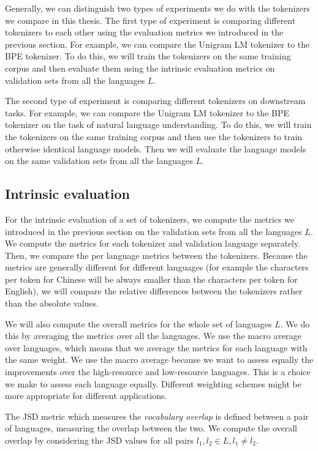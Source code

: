 Generally, we can distinguish two types of experiments we do with the tokenizers we compare in this thesis. The first type of experiment is comparing different tokenizers to each other using the evaluation metrics we introduced in the previous section. For example, we can compare the Unigram LM tokenizer to the BPE tokenizer. To do this, we will train the tokenizers on the same training corpus and then evaluate them using the intrinsic evaluation metrics on validation sets from all the languages $L$. 

The second type of experiment is comparing different tokenizers on downstream tasks. For example, we can compare the Unigram LM tokenizer to the BPE tokenizer on the task of natural language understanding. To do this, we will train the tokenizers on the same training corpus and then use the tokenizers to train otherwise identical language models. Then we will evaluate the language models on the same validation sets from all the languages $L$. 

\subsection{Intrinsic evaluation}
\label{sec:intrinsic_evaluation}

For the intrinsic evaluation of a set of tokenizers, we compute the metrics we introduced in the previous section on the validation sets from all the languages $L$. We compute the metrics for each tokenizer and validation language separately. Then, we compare the per language metrics between the tokenizers. Because the metrics are generally different for different languages (for example the characters per token for Chinese will be always smaller than the characters per token for English), we will compare the relative differences between the tokenizers rather than the absolute values.

We will also compute the overall metrics for the whole set of languages $L$. We do this by averaging the metrics over all the languages. We use the macro average over languages, which means that we average the metrics for each language with the same weight. We use the macro average because we want to assess equally the improvements over the high-resource and low-resource languages. This is a choice we make to assess each language equally. Different weighting schemes might be more appropriate for different applications.

The JSD metric which measures the \textit{vocabulary overlap} is defined between a pair of languages, measuring the overlap between the two. We compute the overall overlap by considering the JSD values for all pairs $l_1, l_2 \in L, l_1 \neq l_2$.

